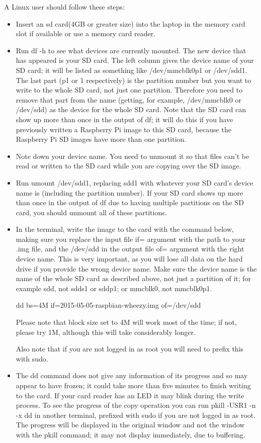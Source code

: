 \documentclass[11pt,a4paper]{report}
\begin{document}
	A Linux user should follow these steps:
		\begin{itemize}
			\item Insert an sd card(4GB or greater size) into the laptop in the memory card slot if available or use a memory card reader.
			\item Run df -h to see what devices are currently mounted. The new device that has appeared is your SD card. The left column gives the device name of your SD card; it will be listed as something like /dev/mmcblk0p1 or /dev/sdd1. The last part (p1 or 1 respectively) is the partition number but you want to write to the whole SD card, not just one partition. Therefore you need to remove that part from the name (getting, for example, /dev/mmcblk0 or /dev/sdd) as the device for the whole SD card. Note that the SD card can show up more than once in the output of df; it will do this if you have previously written a Raspberry Pi image to this SD card, because the Raspberry Pi SD images have more than one partition.
			\item Note down your device name. You need to unmount it so that files can't be read or written to the SD card while you are copying over the SD image.
			\item Run umount /dev/sdd1, replacing sdd1 with whatever your SD card's device name is (including the partition number).
			If your SD card shows up more than once in the output of df due to having multiple partitions on the SD card, you should unmount all of these partitions.
			\item In the terminal, write the image to the card with the command below, making sure you replace the input file if= argument with the path to your .img file, and the /dev/sdd in the output file of= argument with the right device name. This is very important, as you will lose all data on the hard drive if you provide the wrong device name. Make sure the device name is the name of the whole SD card as described above, not just a partition of it; for example sdd, not sdds1 or sddp1; or mmcblk0, not mmcblk0p1.
			
			dd bs=4M if=2015-05-05-raspbian-wheezy.img of=/dev/sdd
			
			Please note that block size set to 4M will work most of the time; if not, please try 1M, although this will take considerably longer.
			
			Also note that if you are not logged in as root you will need to prefix this with sudo.
			\item The dd command does not give any information of its progress and so may appear to have frozen; it could take more than five minutes to finish writing to the card. If your card reader has an LED it may blink during the write process. To see the progress of the copy operation you can run pkill -USR1 -n -x dd in another terminal, prefixed with sudo if you are not logged in as root. The progress will be displayed in the original window and not the window with the pkill command; it may not display immediately, due to buffering.
			

\end{itemize}
\end{document}
